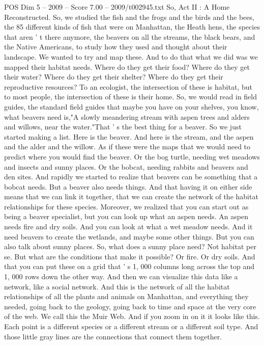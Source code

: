 \begin{textsample}{POS Dim 5 – 2009 – Score 7.00 – 2009/t002945.txt}
So, Act II : A Home Reconstructed.
So, we studied the fish and the frogs and the birds and the bees, the 85 different kinds of fish that were on Manhattan, the Heath hens, the species that aren ' t there anymore, the beavers on all the streams, the black bears, and the Native Americans, to study how they used and thought about their landscape.
We wanted to try and map these.
And to do that what we did was we mapped their habitat needs.
Where do they get their food?
Where do they get their water?
Where do they get their shelter?
Where do they get their reproductive resources?
To an ecologist, the intersection of these is habitat, but to most people, the intersection of these is their home.
So, we would read in field guides, the standard field guides that maybe you have on your shelves, you know, what beavers need is,"A slowly meandering stream with aspen trees and alders and willows, near the water."That ' s the best thing for a beaver.
So we just started making a list.
Here is the beaver.
And here is the stream, and the aspen and the alder and the willow.
As if these were the maps that we would need to predict where you would find the beaver.
Or the bog turtle, needing wet meadows and insects and sunny places.
Or the bobcat, needing rabbits and beavers and den sites.
And rapidly we started to realize that beavers can be something that a bobcat needs.
But a beaver also needs things.
And that having it on either side means that we can link it together, that we can create the network of the habitat relationships for these species.
Moreover, we realized that you can start out as being a beaver specialist, but you can look up what an aspen needs.
An aspen needs fire and dry soils.
And you can look at what a wet meadow needs.
And it need beavers to create the wetlands, and maybe some other things.
But you can also talk about sunny places.
So, what does a sunny place need?
Not habitat per se.
But what are the conditions that make it possible?
Or fire.
Or dry soils.
And that you can put these on a grid that ' s 1, 000 columns long across the top and 1, 000 rows down the other way.
And then we can visualize this data like a network, like a social network.
And this is the network of all the habitat relationships of all the plants and animals on Manhattan, and everything they needed, going back to the geology, going back to time and space at the very core of the web.
We call this the Muir Web.
And if you zoom in on it it looks like this.
Each point is a different species or a different stream or a different soil type.
And those little gray lines are the connections that connect them together.

\end{textsample}
